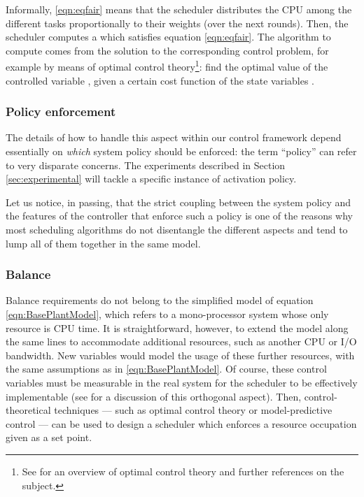 \documentclass[a4paper]{article}
\begin{document}
Informally, \eqref{eqn:eqfair} means that the scheduler distributes the CPU
among the different tasks proportionally to their weights (over the next 
 rounds). Then, the scheduler computes a  which satisfies equation 
\eqref{eqn:eqfair}. The algorithm to compute  comes from the solution to the corresponding control problem, for example by means of optimal control theory\footnote{See \cite{Doyle-1996a} for an overview of optimal control theory and further references on the subject.}: find the optimal value of the controlled variable , given a certain cost function  of the state variables .

\subsubsection{Policy enforcement}
The details of how to handle this aspect within our control framework depend
essentially on \emph{which} system policy should be enforced: the term 
``policy'' can refer to very disparate concerns. The experiments described in 
Section \ref{sec:experimental} will tackle a specific instance of activation 
policy.

Let us notice, in passing, that the strict coupling between the system policy 
and the features of the controller that enforce such a policy is one of the 
reasons why most scheduling algorithms do not disentangle the different aspects 
and tend to lump all of them together in the same model.


\subsubsection{Balance}
Balance requirements do not belong to the simplified model of equation 
\eqref{eqn:BasePlantModel}, which refers to a mono-processor system whose only 
resource is CPU time. It is straightforward, however, to extend the model along 
the same lines to accommodate additional resources, such as another CPU or 
I/O bandwidth. New variables would model the usage of these further resources, 
with the same assumptions as in \eqref{eqn:BasePlantModel}.
Of course, these control variables must be measurable in the real system for 
the scheduler to be effectively implementable (see \cite{HellersteinEtAl-2005a} 
for a discussion of this orthogonal aspect).
Then, control-theoretical techniques --- such as optimal control theory or 
model-predictive control --- can be used to design a scheduler which enforces 
a resource occupation given as a set point.
\end{document}
